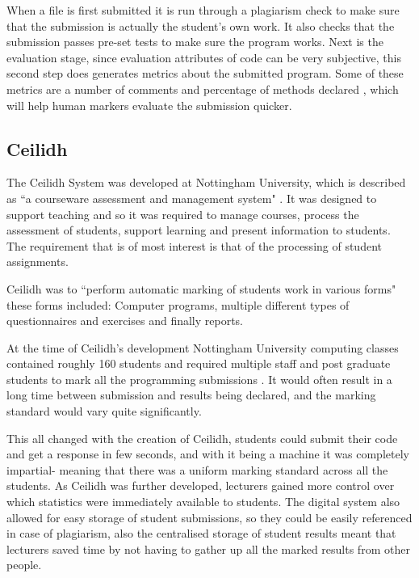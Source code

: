 \documentclass[11pt]{report}
\begin{document}
When a file is first submitted it is run through a plagiarism check to make sure that the submission is actually the student’s own work. It also checks that the submission passes pre-set tests to make sure the program works. Next is the evaluation stage, since evaluation attributes of code can be very subjective, this second step does generates metrics about the submitted program. Some of these metrics are a number of comments and percentage of methods declared \cite{joy_effective_1998-1}, which will help human markers evaluate the submission quicker.


\subsection{Ceilidh}

The Ceilidh System was developed at Nottingham University, which is described as ``a courseware assessment and management system" \cite{benford_ceilidh:_????}. It was designed to support teaching and so it was required to manage courses, process the assessment of students, support learning and present information to students. The requirement that is of most interest is that of the processing of student assignments.

Ceilidh was to ``perform automatic marking of students work in various forms" \cite{benford_ceilidh_1995} these forms included: Computer programs, multiple different types of questionnaires and exercises and finally reports. 

At the time of Ceilidh's development Nottingham University computing classes contained roughly 160 students and required multiple staff and post graduate students to mark all the programming submissions \cite{benford_ceilidh_1995}. It would often result in a long time between submission and results being declared, and the marking standard would vary quite significantly.

This all changed with the creation of Ceilidh, students could submit their code and get a response in few seconds, and with it being a machine it was completely impartial- meaning that there was a uniform marking standard across all the students. As Ceilidh was further developed, lecturers gained more control over which statistics were immediately available to students. The digital system also allowed for easy storage of student submissions, so they could be easily referenced in case of plagiarism, also the centralised storage of student results meant that lecturers saved time by not having to gather up all the marked results from other people. 
\end{document}
